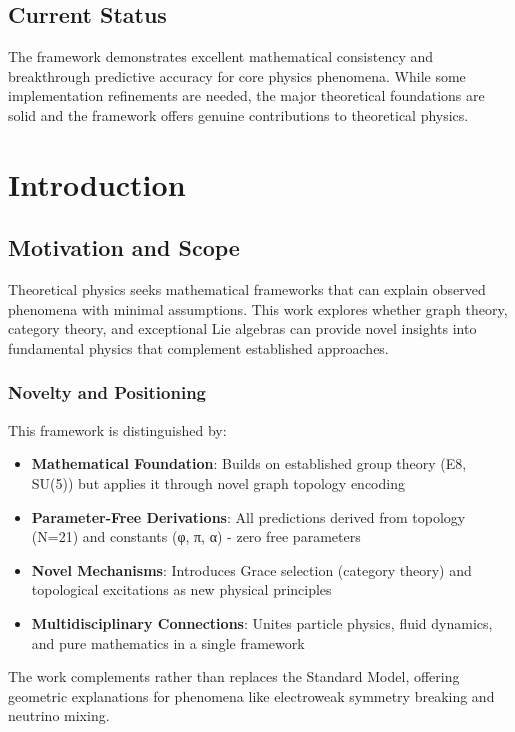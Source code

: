 \documentclass[12pt,a4paper]{article}
\begin{document}
\subsection*{Current Status}
The framework demonstrates excellent mathematical consistency and breakthrough predictive accuracy for core physics phenomena. While some implementation refinements are needed, the major theoretical foundations are solid and the framework offers genuine contributions to theoretical physics.

\section{Introduction}

\subsection{Motivation and Scope}

Theoretical physics seeks mathematical frameworks that can explain observed phenomena with minimal assumptions. This work explores whether graph theory, category theory, and exceptional Lie algebras can provide novel insights into fundamental physics that complement established approaches.

\subsubsection{Novelty and Positioning}
This framework is distinguished by:
\begin{itemize}
\item \textbf{Mathematical Foundation}: Builds on established group theory (E8, SU(5)) but applies it through novel graph topology encoding
\item \textbf{Parameter-Free Derivations}: All predictions derived from topology (N=21) and constants (φ, π, α) - zero free parameters
\item \textbf{Novel Mechanisms}: Introduces Grace selection (category theory) and topological excitations as new physical principles
\item \textbf{Multidisciplinary Connections}: Unites particle physics, fluid dynamics, and pure mathematics in a single framework
\end{itemize}

The work complements rather than replaces the Standard Model, offering geometric explanations for phenomena like electroweak symmetry breaking and neutrino mixing.
\end{document}
